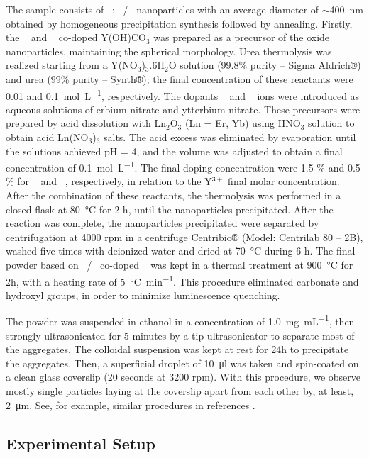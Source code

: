 \documentclass[journal=jacsat,manuscript=article, layout=twocolumn]{achemso}
\newcommand*\Yttria[1]{Y$_{2}$O$_{3}$}
\newcommand*\Yb[1]{Yb$^{3+}$}
\newcommand*\Er[1]{Er$^{3+}$}
\begin{document}
The sample consists of \Yttria~: \Yb~/\Er~ nanoparticles with an average diameter of $\sim$\SI{400}{\nano\meter} obtained by homogeneous precipitation synthesis followed by annealing. Firstly, the \Er~ and \Yb~ co-doped Y(OH)CO$_3$ was prepared as a precursor of the oxide nanoparticles, maintaining the spherical morphology. Urea thermolysis was realized starting from a Y(NO$_3$)$_3$.6H$_2$O solution (99.8\% purity – Sigma Aldrich®) and urea (99\% purity – Synth®); the final concentration of these reactants were 0.01 and \SI{0.1}{\mol\per\liter}, respectively. The dopants \Er~ and \Yb~ ions were introduced as aqueous solutions of erbium nitrate and ytterbium nitrate. These precursors were prepared by acid dissolution with Ln$_2$O$_3$ (Ln = Er, Yb) using HNO$_3$ solution to obtain acid Ln(NO$_3$)$_3$ salts. The acid excess was eliminated by evaporation until the solutions achieved pH = 4, and the volume was adjusted to obtain a final concentration of \SI{0.1}{\mol\per\liter}. The final doping concentration were 1.5 \% and 0.5 \% for \Er~ and \Yb~, respectively, in relation to the Y$^{3+}$ final molar concentration. After the combination of these reactants, the thermolysis was performed in a closed flask at \SI{80}{\celsius} for 2 h, until the nanoparticles precipitated. After the reaction was complete, the nanoparticles precipitated were separated by centrifugation at 4000 rpm in a centrifuge Centribio® (Model: Centrilab 80 – 2B), washed five times with deionized water and dried at \SI{70}{\celsius} during 6 h. The final powder based on \Er~/\Yb~ co-doped \Yttria~ was kept in a thermal treatment at \SI{900}{\celsius} for 2h, with a heating rate of \SI{5}{\celsius\per\minute}. This procedure eliminated carbonate and hydroxyl groups, in order to minimize luminescence quenching.

The powder was suspended in ethanol in a concentration of \SI{1.0}{\milli\gram\per\milli\liter}, then strongly ultrasonicated for 5 minutes by a tip ultrasonicator to separate most of the aggregates. The colloidal suspension was kept at rest for 24h to precipitate the aggregates. Then, a superficial droplet of \SI{10}{\micro\litre} was taken and spin-coated on a clean glass coverslip (20 seconds at 3200 rpm). With this procedure, we observe mostly single particles laying at the coverslip apart from each other by, at least, \SI{2}{\micro\meter}. See, for example, similar procedures in references \citep{Galindo_2021, Galindo_2021_corr, Galvao_2021}.

\subsection{Experimental Setup}{\label{subsec:setup}}
\end{document}
